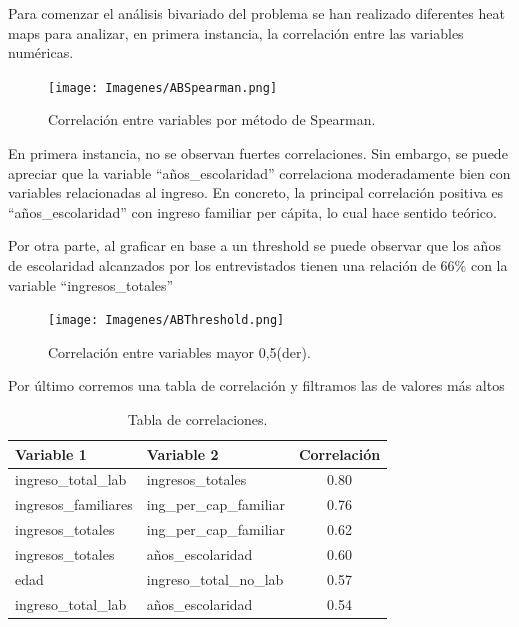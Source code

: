 \documentclass[a4paper]{article}
\begin{document}
        Para comenzar el análisis bivariado del problema se han realizado diferentes heat maps para analizar, en primera instancia, la correlación entre las variables numéricas.        
       
        \begin{figure}[H]
                \centering
            \texttt{[image: Imagenes/ABSpearman.png]}
            \caption{Correlación entre variables por método de Spearman.}
            \label{AB Spearman Correlation}
        \end{figure}
 
        En primera instancia, no se observan fuertes correlaciones. Sin embargo, se puede apreciar que la variable ``años\_escolaridad'' correlaciona moderadamente bien con variables relacionadas al ingreso. En concreto, la principal correlación positiva es ``años\_escolaridad'' con ingreso familiar per cápita, lo cual hace sentido teórico.
        
        Por otra parte, al graficar en base a un threshold se puede observar que los años de escolaridad alcanzados por los entrevistados tienen una relación de $66\%$ con la variable ``ingresos\_totales''

        \begin{figure}[H]
            \centering
            \texttt{[image: Imagenes/ABThreshold.png]}
            \caption{Correlación entre variables mayor 0,5(der).}
            \label{AB Treshold Correlation}
        \end{figure}
 
        Por último corremos una tabla de correlación y filtramos las de valores más altos
 
        \begin{table}[H]
            \centering
            \begin{tabular}{llc}
                \toprule
                Variable 1 & Variable 2 & Correlación \\ \midrule
                ingreso\_total\_lab & ingresos\_totales & 0.80 \\        
                ingresos\_familiares & ing\_per\_cap\_familiar & 0.76 \\ 
                ingresos\_totales & ing\_per\_cap\_familiar & 0.62 \\    
                ingresos\_totales & años\_escolaridad & 0.60 \\          
                edad & ingreso\_total\_no\_lab & 0.57 \\                 
                ingreso\_total\_lab & años\_escolaridad & 0.54 \\
                \bottomrule
            \end{tabular}
            \caption{Tabla de correlaciones.}
            \label{AB Correlation Table}
        \end{table}
 
\end{document}
